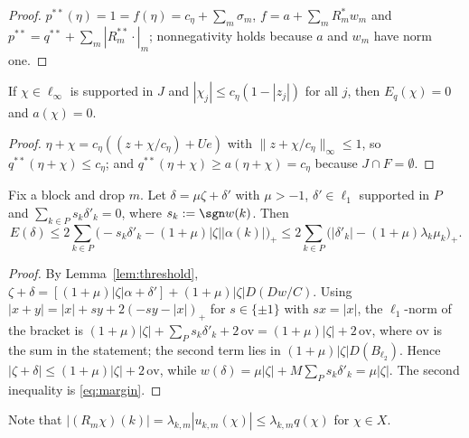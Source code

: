 \begin{proof}
$p^{**}(\eta)=1=f(\eta)=c_\eta+\sum_m\sigma_m$, $f=a+\sum_mR_m^*w_m$ and
$p^{**}=q^{**}+\sum_m|R_m^{**}\cdot|_m$; nonnegativity holds because $a$ and
$w_m$ have norm one.
\end{proof}

\begin{lemma}\label{lem:flat}
If $\chi\in\ell_\infty$ is supported in $J$ and $|\chi_j|\le
c_\eta(1-|z_j|)$ for all $j$, then $E_q(\chi)=0$ and $a(\chi)=0$.
\end{lemma}

\begin{proof}
$\eta+\chi=c_\eta((z+\chi/c_\eta)+Ue)$ with $\|z+\chi/c_\eta\|_\infty\le1$,
so $q^{**}(\eta+\chi)\le c_\eta$; and $q^{**}(\eta+\chi)\ge a(\eta+\chi)=
c_\eta$ because $J\cap F=\emptyset$.
\end{proof}

\begin{lemma}\label{lem:overshoot}
Fix a block and drop $m$.  Let $\delta=\mu\zeta+\delta'$ with $\mu>-1$,
$\delta'\in\ell_1$ supported in $P$ and $\sum_{k\in P}s_k\delta'_k=0$, where
$s_k:=\sgn w(k)$.  Then
\[
 E(\delta)\le2\sum_{k\in P}\big(-s_k\delta'_k-(1+\mu)|\zeta||\alpha(k)|
 \big)_+\le2\sum_{k\in P}\big(|\delta'_k|-(1+\mu)\lambda_k\mu_k\big)_+ .
\]
\end{lemma}

\begin{proof}
By Lemma~\ref{lem:threshold}, $\zeta+\delta=[(1+\mu)|\zeta|\alpha+\delta']
+(1+\mu)|\zeta|D(Dw/C)$.  Using $|x+y|=|x|+sy+2(-sy-|x|)_+$ for $s\in\{\pm1\}$
with $sx=|x|$, the $\ell_1$-norm of the bracket is $(1+\mu)|\zeta|+
\sum_Ps_k\delta'_k+2\,\mathrm{ov}=(1+\mu)|\zeta|+2\,\mathrm{ov}$, where
$\mathrm{ov}$ is the sum in the statement; the second term lies in
$(1+\mu)|\zeta|D(B_{\ell_2})$.  Hence $|\zeta+\delta|\le(1+\mu)|\zeta|
+2\,\mathrm{ov}$, while $w(\delta)=\mu|\zeta|+M\sum_Ps_k\delta'_k=\mu|\zeta|$.
The second inequality is \eqref{eq:margin}.
\end{proof}

Note that $|(R_m\chi)(k)|=\lambda_{k,m}|u_{k,m}(\chi)|\le\lambda_{k,m}q(\chi)$
for $\chi\in X$.

